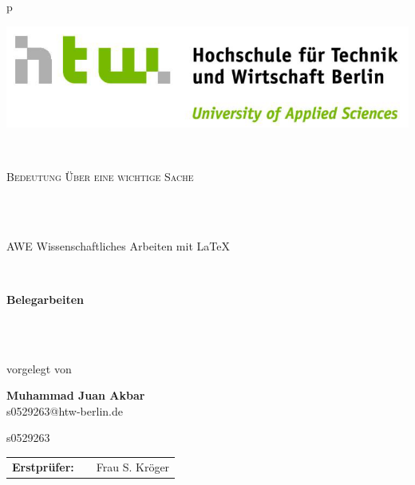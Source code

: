 \begin{center}
\begin{tabular}{p{\textwidth}}


\begin{center}
\includegraphics[scale=0.5]{img/htw-logo.png}
\end{center}


\\

\begin{center}
\LARGE{\textsc{
Bedeutung Über eine wichtige Sache\\
}}
\end{center}

\\
\\


\begin{center}
\large{AWE Wissenschaftliches Arbeiten mit LaTeX} \\
\end{center}

\\

\begin{center}
\textbf{\Large{Belegarbeiten}} \\
\end{center}


\\
\\


\begin{center}
vorgelegt von
\end{center}

\begin{center}
\large{\textbf{Muhammad Juan Akbar}} \\
\small{s0529263@htw-berlin.de}
\end{center}

\begin{center}
\large{s0529263} \\
\end{center}

\begin{center}
\begin{tabular}{lll}
\textbf{Erstprüfer:} & & Frau S. Kröger
\end{tabular}
\end{center}

\end{tabular}
\end{center}
